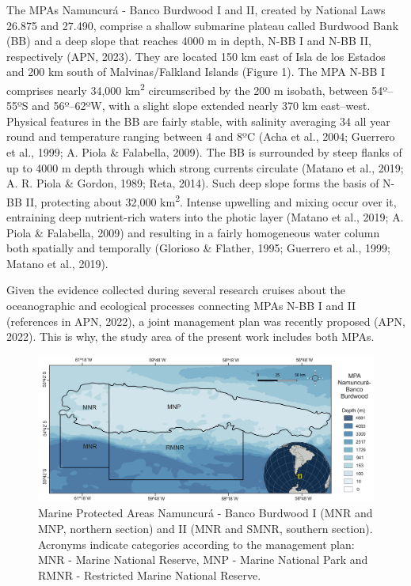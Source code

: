\documentclass[preprint, 3p,
authoryear]{elsarticle} %
\begin{document}
The MPAs Namuncurá - Banco Burdwood I and II, created by National Laws
26.875 and 27.490, comprise a shallow submarine plateau called Burdwood
Bank (BB) and a deep slope that reaches 4000 m in depth, N-BB I and N-BB
II, respectively (APN, 2023). They are located 150 km east of Isla de
los Estados and 200 km south of Malvinas/Falkland Islands (Figure 1).
The MPA N-BB I comprises nearly 34,000 km\textsuperscript{2}
circumscribed by the 200 m isobath, between 54º--55ºS and 56º--62ºW,
with a slight slope extended nearly 370 km east--west. Physical features
in the BB are fairly stable, with salinity averaging 34 all year round
and temperature ranging between 4 and 8ºC (Acha et al., 2004; Guerrero
et al., 1999; A. Piola \& Falabella, 2009). The BB is surrounded by
steep flanks of up to 4000 m depth through which strong currents
circulate (Matano et al., 2019; A. R. Piola \& Gordon, 1989; Reta,
2014). Such deep slope forms the basis of N-BB II, protecting about
32,000 km\textsuperscript{2}. Intense upwelling and mixing occur over
it, entraining deep nutrient-rich waters into the photic layer (Matano
et al., 2019; A. Piola \& Falabella, 2009) and resulting in a fairly
homogeneous water column both spatially and temporally (Glorioso \&
Flather, 1995; Guerrero et al., 1999; Matano et al., 2019).

Given the evidence collected during several research cruises about the
oceanographic and ecological processes connecting MPAs N-BB I and II
(references in APN, 2022), a joint management plan was recently proposed
(APN, 2022). This is why, the study area of the present work includes
both MPAs.

\begin{figure}
\includegraphics[width=1\linewidth]{MPABurdwood_map} \caption{Marine Protected Areas Namuncurá - Banco Burdwood I (MNR and MNP, northern section) and II (MNR and SMNR, southern section). Acronyms indicate categories according to the management plan: MNR - Marine National Reserve, MNP - Marine National Park and RMNR - Restricted Marine National Reserve.}\label{fig:figure1}
\end{figure}
\end{document}
